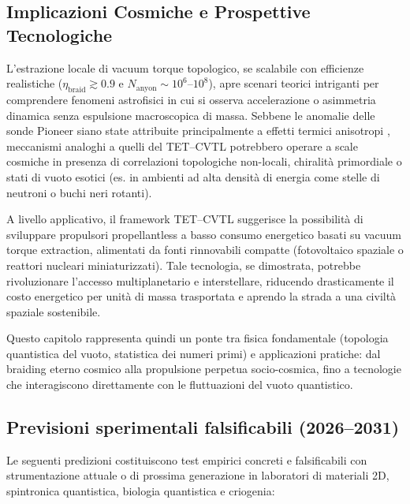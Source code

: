 \documentclass[11pt,a4paper]{article}
\let\oldcite\cite
\renewcommand{\cite}{\protect\oldcite}
\theoremstyle{plain}
\theoremstyle{definition}
\begin{document}
\subsection{Implicazioni Cosmiche e Prospettive Tecnologiche}

L'estrazione locale di vacuum torque topologico, se scalabile con efficienze realistiche ($\eta_{\mathrm{braid}} \gtrsim 0.9$ e $N_{\mathrm{anyon}} \sim 10^6$--$10^8$), apre scenari teorici intriganti per comprendere fenomeni astrofisici in cui si osserva accelerazione o asimmetria dinamica senza espulsione macroscopica di massa. Sebbene le anomalie delle sonde Pioneer siano state attribuite principalmente a effetti termici anisotropi \cite{turyshev2012support}, meccanismi analoghi a quelli del TET--CVTL potrebbero operare a scale cosmiche in presenza di correlazioni topologiche non-locali, chiralità primordiale o stati di vuoto esotici (es. in ambienti ad alta densità di energia come stelle di neutroni o buchi neri rotanti).


\vspace{0.4cm}

A livello applicativo, il framework TET--CVTL suggerisce la possibilità di sviluppare propulsori propellantless a basso consumo energetico basati su vacuum torque extraction, alimentati da fonti rinnovabili compatte (fotovoltaico spaziale o reattori nucleari miniaturizzati). Tale tecnologia, se dimostrata, potrebbe rivoluzionare l'accesso multiplanetario e interstellare, riducendo drasticamente il costo energetico per unità di massa trasportata e aprendo la strada a una civiltà spaziale sostenibile.

\vspace{0.4cm}

Questo capitolo rappresenta quindi un ponte tra fisica fondamentale (topologia quantistica del vuoto, statistica dei numeri primi) e applicazioni pratiche: dal braiding eterno cosmico alla propulsione perpetua socio-cosmica, fino a tecnologie che interagiscono direttamente con le fluttuazioni del vuoto quantistico.

\subsection{Previsioni sperimentali falsificabili (2026--2031)}

Le seguenti predizioni costituiscono test empirici concreti e falsificabili con strumentazione attuale o di prossima generazione in laboratori di materiali 2D, spintronica quantistica, biologia quantistica e criogenia:
\end{document}
